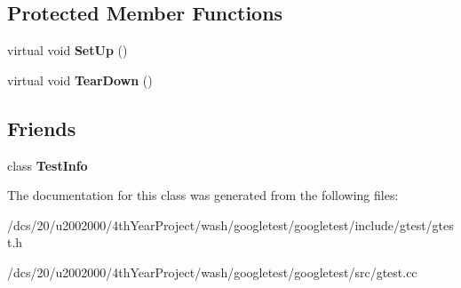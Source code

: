 \subsection*{Protected Member Functions}
\begin{DoxyCompactItemize}
\item 
\mbox{\label{classtesting_1_1Test_a190315150c303ddf801313fd1a777733}} 
virtual void {\bfseries Set\+Up} ()
\item 
\mbox{\label{classtesting_1_1Test_a5f0ab439802cbe0ef7552f1a9f791923}} 
virtual void {\bfseries Tear\+Down} ()
\end{DoxyCompactItemize}
\subsection*{Friends}
\begin{DoxyCompactItemize}
\item 
\mbox{\label{classtesting_1_1Test_a4c49c2cdb6c328e6b709b4542f23de3c}} 
class {\bfseries Test\+Info}
\end{DoxyCompactItemize}


The documentation for this class was generated from the following files\+:\begin{DoxyCompactItemize}
\item 
/dcs/20/u2002000/4th\+Year\+Project/wash/googletest/googletest/include/gtest/gtest.\+h\item 
/dcs/20/u2002000/4th\+Year\+Project/wash/googletest/googletest/src/gtest.\+cc\end{DoxyCompactItemize}
